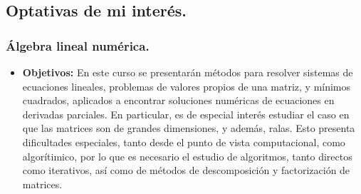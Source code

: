 \documentclass[10pt,a4paper]{article}
\begin{document}
\subsection{Optativas de mi interés.}
\subsubsection{Álgebra lineal numérica.}
\begin{itemize}
	\item \textbf{Objetivos:} En este curso se presentarán métodos para resolver sistemas de ecuaciones lineales, problemas de valores propios de una matriz, y mínimos cuadrados, aplicados a encontrar soluciones numéricas de ecuaciones en derivadas parciales. En particular, es de especial interés estudiar el caso en que las matrices son de grandes dimensiones, y además, ralas. Esto presenta dificultades especiales, tanto desde el punto de vista computacional, como algorítimico, por lo que es necesario el estudio de algoritmos, tanto directos como iterativos, así como de métodos de descomposición y factorización de matrices.
\end{itemize}
\end{document}
